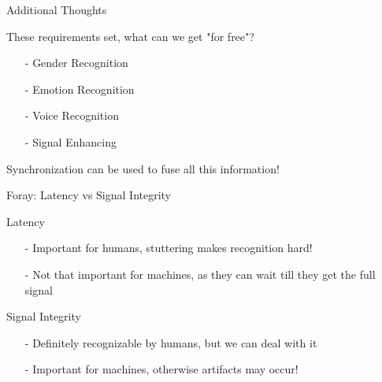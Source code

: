 \documentclass{beamer}
\begin{document}
	
	\begin{frame}{Additional Thoughts}
		\begin{alertblock}{These requirements set, what can we get "for free"?}
			\pause
			\begin{itemize}
				\item[-] Gender Recognition
				\item[-] Emotion Recognition
				\item[-] Voice Recognition
				\item[-] Signal Enhancing
			\end{itemize}
			\pause
			Synchronization can be used to fuse all this information!
		\end{alertblock}
	\end{frame}
	
	\begin{frame}{Foray: Latency vs Signal Integrity}
		\begin{alertblock}{Latency}
			\begin{itemize}
				\item[-] Important for humans, stuttering makes recognition hard!
				\item[-] Not that important for machines, as they can wait till they get the full signal
			\end{itemize}
		\end{alertblock}
		\pause
		\begin{alertblock}{Signal Integrity}
			\begin{itemize}
				\item[-] Definitely recognizable by humans, but we can deal with it
				\item[-] Important for machines, otherwise artifacts may occur!
			\end{itemize}
		\end{alertblock}
	\end{frame}
	
\end{document}
